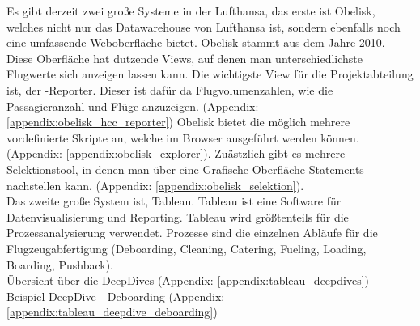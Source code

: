 		Es gibt derzeit zwei große Systeme in der Lufthansa, das erste ist Obelisk, welches nicht nur das Datawarehouse von Lufthansa ist, sondern ebenfalls noch eine umfassende Weboberfläche bietet. Obelisk stammt aus dem Jahre 2010.
		Diese Oberfläche hat dutzende Views, auf denen man unterschiedlichste Flugwerte sich anzeigen lassen kann. Die wichtigste View für die Projektabteilung ist, der -Reporter. Dieser ist dafür da Flugvolumenzahlen, wie die Passagieranzahl und Flüge anzuzeigen.
		(Appendix: \ref{appendix:obelisk_hcc_reporter})
		Obelisk bietet die möglich mehrere vordefinierte  Skripte an, welche im Browser ausgeführt werden können. (Appendix: \ref{appendix:obelisk_explorer}).
		Zuästzlich gibt es mehrere Selektionstool, in denen man über eine Grafische Oberfläche  Statements nachstellen kann. (Appendix: \ref{appendix:obelisk_selektion}).\\

		Das zweite große System ist, Tableau. Tableau ist eine Software für Datenvisualisierung und Reporting. Tableau wird größtenteils für die Prozessanalysierung verwendet. Prozesse sind die einzelnen Abläufe für die Flugzeugabfertigung (Deboarding, Cleaning, Catering, Fueling, Loading, Boarding, Pushback).\\
		
		Übersicht über die DeepDives (Appendix: \ref{appendix:tableau_deepdives})\\
		Beispiel DeepDive - Deboarding (Appendix: \ref{appendix:tableau_deepdive_deboarding})